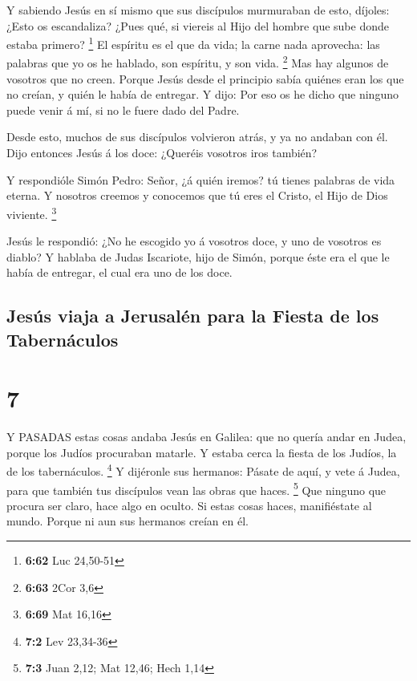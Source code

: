  Y sabiendo Jesús en sí mismo que sus discípulos murmuraban
de esto, díjoles: ¿Esto os escandaliza?  ¿Pues qué, si
viereis al Hijo del hombre que sube donde estaba primero? \footnote{\textbf{6:62}
  Luc 24,50-51}  El espíritu es el que da vida; la carne
nada aprovecha: las palabras que yo os he hablado, son espíritu, y son
vida. \footnote{\textbf{6:63} 2Cor 3,6}  Mas hay algunos de
vosotros que no creen. Porque Jesús desde el principio sabía quiénes
eran los que no creían, y quién le había de entregar.  Y
dijo: Por eso os he dicho que ninguno puede venir á mí, si no le fuere
dado del Padre.

 Desde esto, muchos de sus discípulos volvieron atrás, y ya
no andaban con él.  Dijo entonces Jesús á los doce:
¿Queréis vosotros iros también?

 Y respondióle Simón Pedro: Señor, ¿á quién iremos? tú
tienes palabras de vida eterna.  Y nosotros creemos y
conocemos que tú eres el Cristo, el Hijo de Dios viviente. \footnote{\textbf{6:69}
  Mat 16,16}

 Jesús le respondió: ¿No he escogido yo á vosotros doce, y
uno de vosotros es diablo?  Y hablaba de Judas Iscariote,
hijo de Simón, porque éste era el que le había de entregar, el cual era
uno de los doce.

\hypertarget{jesuxfas-viaja-a-jerusaluxe9n-para-la-fiesta-de-los-tabernuxe1culos}{%
\subsection{Jesús viaja a Jerusalén para la Fiesta de los
Tabernáculos}\label{jesuxfas-viaja-a-jerusaluxe9n-para-la-fiesta-de-los-tabernuxe1culos}}

\hypertarget{section-6}{%
\section{7}\label{section-6}}

 Y PASADAS estas cosas andaba Jesús en Galilea: que no
quería andar en Judea, porque los Judíos procuraban matarle.
 Y estaba cerca la fiesta de los Judíos, la de los
tabernáculos. \footnote{\textbf{7:2} Lev 23,34-36}  Y
dijéronle sus hermanos: Pásate de aquí, y vete á Judea, para que también
tus discípulos vean las obras que haces. \footnote{\textbf{7:3} Juan
  2,12; Mat 12,46; Hech 1,14}  Que ninguno que procura ser
claro, hace algo en oculto. Si estas cosas haces, manifiéstate al mundo.
 Porque ni aun sus hermanos creían en él.

